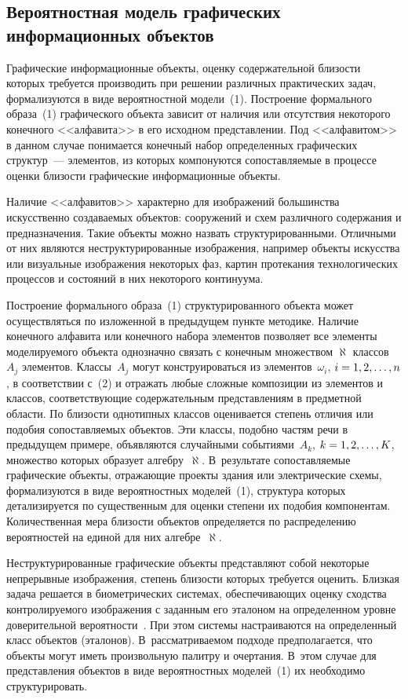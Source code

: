 \begin{multicols}{2}
\section{Вероятностная модель графических информационных
объектов}

  Графические информационные объекты, оценку содержательной близости
которых требуется производить при решении различных практических задач,
формализуются в виде вероятностной модели~(1). Построение формального
образа~(1) графического объекта зависит от наличия или отсутствия некоторого
конечного <<алфавита>> в его исходном представлении. Под <<алфавитом>> в
данном случае понимается конечный набор определенных графических
структур~--- элементов, из которых компонуются сопоставляемые в процессе
оценки близости графические информационные объекты.

  Наличие <<алфавитов>> характерно для изображений большинства
искусственно создаваемых объектов: сооружений и схем различного
содержания и предназначения. Такие объекты можно назвать
структурированными. Отличными от них являются неструктурированные
изображения, например объекты искусства или визуальные изображения
некоторых фаз, картин протекания технологических процессов и состояний в
них некоторого континуума.

  Построение формального образа~(1) структурированного объекта может
осуществляться по изложенной в предыдущем пункте методике. Наличие
конечного алфавита или конечного набора элементов позволяет все элементы
моделируемого объекта однозначно связать с конечным множеством $\aleph$
классов~$A_j$ элементов. Классы~$A_j$ могут конструироваться из
элементов~$\omega_i$, $i\hm= 1, 2, \ldots , n$, в соответствии с~(2) и отражать
любые сложные\linebreak
композиции из элементов и классов, соответствующие
содержательным представлениям в предметной области. По близости
однотипных классов оценивает\-ся степень отличия или подобия сопоставляемых
объектов. Эти классы, подобно частям речи в предыдущем примере,
объявляются случайными событиями~$A_k$, $k\hm=1, 2, \ldots , K$, множество
которых образует алгебру~$\aleph$. В~результате сопоставляемые графические
объекты, отражающие проекты здания или электрические схемы,
формализуются в виде вероятностных моделей~(1), структура которых
детализируется по существенным для оценки степени их подобия компонентам.
Количественная мера близости объектов определяется по распределению
вероятностей на единой для них алгебре~$\aleph$.

  Неструктурированные графические объекты представляют собой некоторые
непрерывные изоб\-ра\-же\-ния, степень близости которых требуется оценить.
Близкая задача решается в биометрических системах, обеспечивающих оценку
сходства контролируемого изображения с заданным его эталоном на
определенном уровне доверительной вероятности~\cite{9-kuz}. При этом
системы настраиваются на определенный класс объектов (эталонов).
В~рассматриваемом подходе предполагается, что объекты могут иметь
произвольную палитру и очертания. В~этом случае для представления объектов
в виде вероятностных моделей~(1) их необходимо структурировать.


\end{multicols}
